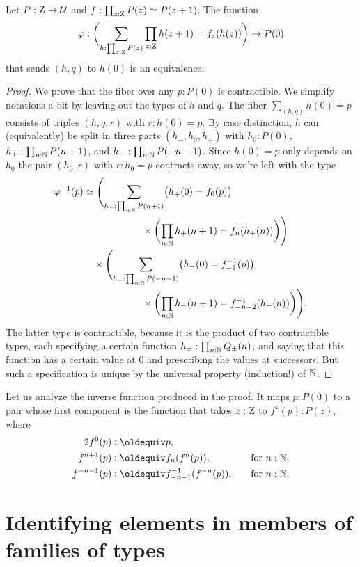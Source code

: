\documentclass[a4,12pt]{amsart}
\begin{document}
\begin{theorem}\label{thm:integers-univ-symm}
  Let $P : \mathrm{Z} \to \mathcal{U}$ and $f : \prod_{z:\mathrm{Z}}P(z) \simeq P(z+1)$. The function
  \[
    \varphi : \biggl(\sum_{h:\prod_{z:\mathrm{Z}}P(z)}\prod_{z:\mathrm{Z}}h(z+1) = f_z(h(z))\biggr) \to P(0)
  \]
  that sends $(h,q)$ to $h(0)$ is an equivalence.
\end{theorem}
\begin{proof}
  We prove that the fiber over any $p : P(0)$ is contractible.
  We simplify notations a bit by leaving out the types of $h$ and $q$.
  The fiber $\sum_{(h,q)} h(0)=p$ consists of triples $(h,q,r)$ with $r : h(0) = p$.
  By case distinction, $h$ can (equivalently) be split in three parts $(h_-,h_0,h_+)$
  with $h_0 : P(0)$, $h_+ : \prod_{n:\mathbb{N}}P(n+1)$,  and $h_- : \prod_{n:\mathbb{N}} P(-n-1)$. 
  Since $h(0)=p$ only depends on $h_0$ the pair $(h_0,r)$ with  $r : h_0 = p$
  contracts away, so we're left with the type
  \begin{align*}
    \varphi^{-1}(p)
    &\simeq
      \Biggl(\sum_{h_+ : \prod_{n:\mathbb{N}}P(n+1)}
      \bigl(h_+(0) = f_0(p)\bigr) \\
    &\qquad\qquad\qquad
      \times \biggl(\prod_{n:\mathbb{N}}h_+(n+1) = f_n(h_+(n))\biggr)\Biggr) \\
    &\quad\times
      \Biggl(\sum_{h_- : \prod_{n:\mathbb{N}}P(-n-1)}
      \bigl(h_-(0) = f_{-1}^{-1}(p)\bigr) \\
    &\qquad\qquad\qquad
      \times \biggl(\prod_{n:\mathbb{N}}h_-(n+1) = f_{-n-2}^{-1}(h_-(n))\biggr)\Biggr).
  \end{align*}
  The latter type is contractible, because it is the product of two contractible types,
  each specifying a certain function $h_{\pm}:\prod_{n:\mathbb{N}}Q_{\pm}(n)$,
  and saying that this function has a certain value at $0$
  and prescribing the values at successors.
  But such a specification is unique by the universal property (induction!) of $\mathbb{N}$.
\end{proof}
Let us analyze the inverse function produced in the proof.
It maps $p : P(0)$ to a pair whose first component
is the function that takes $z:\mathrm{Z}$ to $f^z(p):P(z)$, where
\begin{alignat*}2
  f^0(p) &\defeq p, && \\
  f^{n+1}(p) &\defeq f_n(f^n(p)),&\quad&\text{for $n:\NN$,} \\
  f^{-n-1}(p) &\defeq f_{-n-1}^{-1}(f^{-n}(p)),&\quad&\text{for $n:\NN$.}
\end{alignat*}


\section{Identifying elements in members of families of types}
\label{sec:pathovers}
\end{document}
